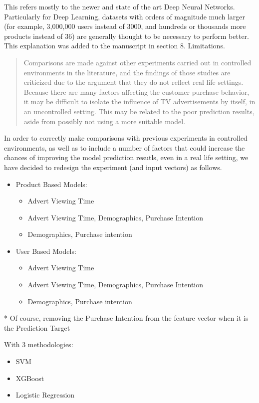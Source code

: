 \documentclass[review]{elsarticle}
\begin{document}
This refers mostly to the newer and state of the art Deep Neural Networks. Particularly for Deep Learning, datasets with orders of magnitude much larger (for example, 3,000,000 users instead of 3000, and hundreds or thousands more products instead of 36) are generally thought to be necessary to perform better. This explanation was added to the manuscript in section 8. Limitations.

\begin{quotation}
Comparisons are made against other experiments carried out in controlled environments in the literature, and the findings of those studies are criticized due to the argument that they do not reflect real life settings. Because there are many factors affecting the customer purchase behavior, it may be difficult to isolate the influence of TV advertisements by itself, in an uncontrolled setting. This may be related to the poor prediction results, aside from possibly not using a more suitable model.
\end{quotation}

In order to correctly make comparisons with previous experiments in controlled environments, as well as to include a number of factors that could increase the chances of improving the model prediction resutls, even in a real life setting, we have decided to redesign the experiment (and input vectors) as follows.

\begin{itemize}
\item Product Based Models:
    \begin{itemize}
        \item Advert Viewing Time
        \item Advert Viewing Time, Demographics, Purchase Intention
        \item Demographics, Purchase intention
    \end{itemize}
\item User Based Models:
    \begin{itemize}
        \item Advert Viewing Time
        \item Advert Viewing Time, Demographics, Purchase Intention
        \item Demographics, Purchase intention
    \end{itemize}
\end{itemize}
* Of course, removing the Purchase Intention from the feature vector when it is the Prediction Target

With 3 methodologies:
\begin{itemize}
    \item SVM
    \item XGBoost
    \item Logistic Regression
\end{itemize}
\end{document}
